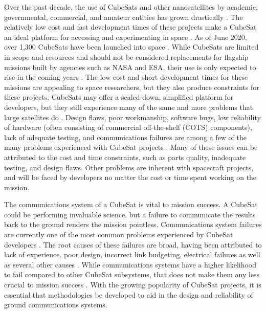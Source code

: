 \documentclass[conf]{new-aiaa}
\begin{document}
Over the past decade, the use of CubeSats and other nanosatellites by academic, governmental, commercial, and amateur entities has grown drastically \cite{cubesat101,Poghosyan2016,Villela2019}. The relatively low cost and fast development times of these projects make a CubeSat an ideal platform %
for accessing and experimenting in space \cite{cubesat101}. As of June 2020, over 1,300 CubeSats have been launched into space \cite{Kulu2020}. While CubeSats are limited in scope and resources and should not be considered replacements for flagship missions built by agencies such as NASA and ESA, their use is only expected to rise in the coming years \cite{Improving2017,cubesat101}. The low cost and short development times for these missions are appealing to space researchers, but they also produce constraints for these projects. CubeSats may offer a scaled-down, simplified platform for developers, but they still experience many of the same and more problems that large satellites do \cite{Improving2017}. Design flaws, poor workmanship, software bugs, low reliability of hardware (often consisting of commercial off-the-shelf (COTS) components), lack of adequate testing, and communications failures are among a few of the many problems experienced with CubeSat projects \cite{Improving2017}. Many of these issues can be attributed to the cost and time constraints, such as parts quality, inadequate testing, and design flaws. Other problems are inherent with spacecraft projects, and will be faced by developers no matter the cost or time spent working on the mission.

The communications system of a CubeSat is vital to mission success. A CubeSat could be performing invaluable science, but a failure to communicate the results back to the ground renders the mission pointless. Communications system failures are currently one of the most common problems experienced by CubeSat developers \cite{Improving2017,Langer2016}. The root causes of these failures are broad, having been attributed to lack of experience, poor design, incorrect link budgeting, electrical failures as well as several other causes \cite{Improving2017,Langer2016}. While communications systems have a higher likelihood to fail compared to other CubeSat subsystems, that does not make them any less crucial to mission success \cite{Improving2017}. With the growing popularity of CubeSat projects, it is essential that methodologies be developed to aid in the design and reliability of ground communications systems.
\end{document}
